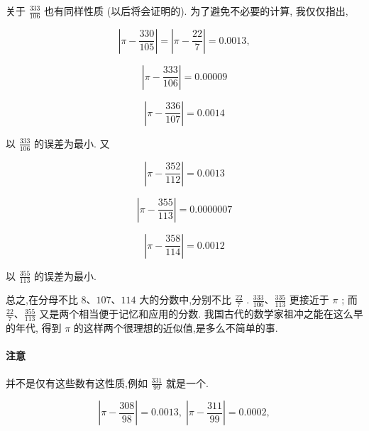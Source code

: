 \documentclass{ctexart}
\begin{document}
\begin{center}
\end{center}

关于 \(\frac{333}{106}\) 也有同样性质 (以后将会证明的). 为了避免不必要的计算, 我仅仅指出,

\[
\left| {\pi - \frac{330}{105}}\right| = \left| {\pi - \frac{22}{7}}\right| = {0.0013},
\]

\[
\left| {\pi - \frac{333}{106}}\right| = {0.00009}
\]

\[
\left| {\pi - \frac{336}{107}}\right| = {0.0014}
\]

以 \(\frac{333}{106}\) 的误差为最小. 又

\[
\left| {\pi - \frac{352}{112}}\right| = {0.0013}
\]

\[
\left| {\pi - \frac{355}{113}}\right| = {0.0000007}
\]

\[
\left| {\pi - \frac{358}{114}}\right| = {0.0012}
\]

以 \(\frac{355}{113}\) 的误差为最小.

总之,在分母不比 \(8\text{、}{107}\text{、}{114}\) 大的分数中,分别不比 \(\frac{22}{7}\) . \(\frac{333}{106}\text{、}\frac{335}{113}\) 更接近于 \(\pi\) ; 而 \(\frac{22}{7}\text{、}\frac{355}{113}\) 又是两个相当便于记忆和应用的分数. 我国古代的数学家祖冲之能在这么早的年代, 得到 \(\pi\) 的这样两个很理想的近似值,是多么不简单的事.

\paragraph*{注意} 并不是仅有这些数有这性质,例如 \(\frac{331}{99}\) 就是一个.

\[
\left| {\pi - \frac{308}{98}}\right| = {0.0013},\;\left| {\pi - \frac{311}{99}}\right| = {0.0002},
\]
\end{document}
